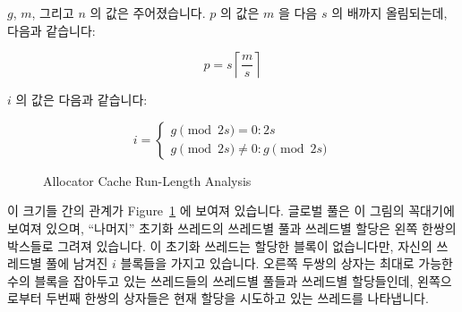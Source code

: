 {{	\fi

	$g$, $m$, 그리고 $n$ 의 값은 주어졌습니다.  $p$ 의 값은 $m$ 을 다음 $s$
	의 배까지 올림되는데, 다음과 같습니다:

	\begin{equation}
		p = s \left \lceil \frac{m}{s} \right \rceil
	\label{sec:SMPdesign:p}
	\end{equation}

	$i$ 의 값은 다음과 같습니다:

	\begin{equation}
		i = \left \{
			\begin{array}{l}
				g \pmod{2 s} = 0: 2 s \\
				g \pmod{2 s} \ne 0: g \pmod{2 s}
			\end{array}
		    \right .
	\label{sec:SMPdesign:i}
	\end{equation}

	\begin{figure}[tb]
	\centering
	\caption{Allocator Cache Run-Length Analysis}
	\label{fig:SMPdesign:Allocator Cache Run-Length Analysis}
	\end{figure}

	이 크기들 간의 관계가
	Figure~\ref{fig:SMPdesign:Allocator Cache Run-Length Analysis}
	에 보여져 있습니다.
	글로벌 풀은 이 그림의 꼭대기에 보여져 있으며, ``나머지'' 초기화
	쓰레드의 쓰레드별 풀과 쓰레드별 할당은 왼쪽 한쌍의 박스들로 그려져
	있습니다.
	이 초기화 쓰레드는 할당한 블록이 없습니다만, 자신의 쓰레드별 풀에
	남겨진 $i$ 블록들을 가지고 있습니다.
	오른쪽 두쌍의 상자는 최대로 가능한 수의 블록을 잡아두고 있는 쓰레드들의
	쓰레드별 풀들과 쓰레드별 할당들인데, 왼쪽으로부터 두번째 한쌍의
	상자들은 현재 할당을 시도하고 있는 쓰레드를 나타냅니다.

}}
